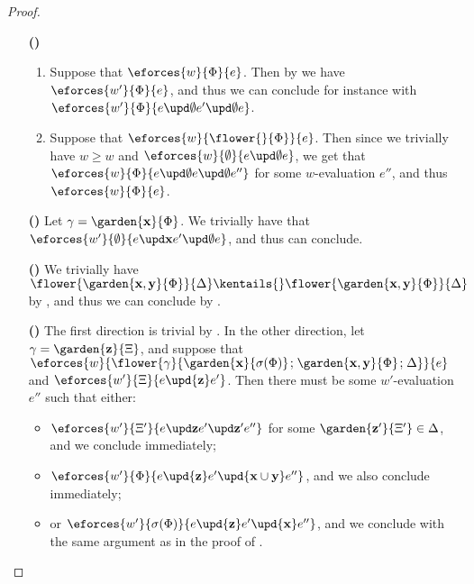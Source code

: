 \begin{scope}
\begin{proof}
\begin{itemize}
    \item[\textbf{(\rsf{epis})}]\sbr
    \begin{enumerate}
      \item Suppose that $\eforces{w}{\Phi}{e}$. Then by 
      we have $\eforces{w'}{\Phi}{e}$, and thus we can conclude for instance with
    $\eforces{w'}{\Phi}{\update{e}{\emptyset}{\update{e'}{\emptyset}{e}}}$.
      \item Suppose that $\eforces{w}{\flower{{}}{\Phi}}{e}$. Then since we
      trivially have $w \geq w$ and
      $\eforces{w}{\emptyset}{\update{e}{\emptyset}{e}}$, we get that
      $\eforces{w}{\Phi}{\update{e}{\emptyset}{\update{e}{\emptyset}{e''}}}$
      for some $w$-evaluation $e''$, and thus $\eforces{w}{\Phi}{e}$.
    \end{enumerate}

    \item[\textbf{(\rsf{epet})}]
      Let $\gamma = \garden{\bx}{\Phi}$. We trivially have that
      $\eforces{w'}{\emptyset}{\update{e}{\bx}{\update{e'}{\emptyset}{e}}}$,
      and thus can conclude.

    \item[\textbf{(\rsf{ipis})}] We trivially have $\flower{\garden{\bx,\by}{\Phi}}{\Delta}
      \kentails{}\flower{\garden{\bx,\by}{\Phi}}{\Delta}$ by
      , and thus we can conclude by
      .

    \item[\textbf{(\rsf{ipet})}] The first direction is trivial by
      . In the other direction, let $\gamma =
      \garden{\bz}{\Xi}$, and suppose that
      $\eforces{w}{\flower{\gamma}{\garden{\bx}{\sigma(\Phi)} \sep
      \garden{\bx,\by}{\Phi} \sep \Delta}}{e}$ and $\eforces{w'}{\Xi}{e
      \upd{\bz} e'}$. Then there must be some $w'$-evaluation $e''$ such that
      either:
      \begin{itemize}
        \item $\eforces{w'}{\Xi'}{\update{e}{\bz}{\update{e'}{\bz'}{e''}}}$ for
        some $\garden{\bz'}{\Xi'} \in \Delta$, and we conclude immediately;
        \item $\eforces{w'}{\Phi}{e \upd{\bz} e' \upd{\bx \cup \by} e''}$, and
        we also conclude immediately;
        \item or $\eforces{w'}{\sigma(\Phi)}{e \upd{\bz} e' \upd{\bx} e''}$, and
        we conclude with the same argument as in the proof of
        .
      \end{itemize}
      

\end{itemize}
\end{proof}
\end{scope}
